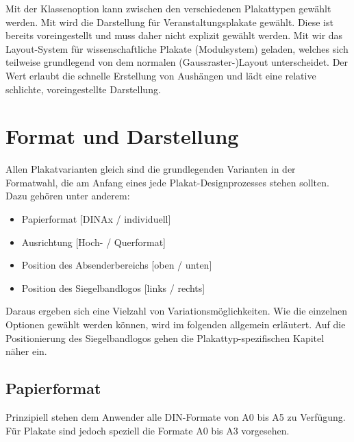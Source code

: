 Mit der Klassenoption  kann zwischen
den verschiedenen Plakattypen gewählt werden.
Mit  wird die Darstellung für Veranstaltungsplakate
gewählt. Diese ist bereits voreingestellt und muss daher nicht explizit gewählt
werden.
Mit  wir das Layout-System für wissenschaftliche Plakate
(Modulsystem) geladen, welches sich teilweise grundlegend von
dem normalen (Gaussraster-)Layout unterscheidet.
Der Wert  erlaubt die schnelle Erstellung von
Aushängen und lädt eine relative schlichte, voreingestellte Darstellung.


\section{Format und Darstellung}

Allen Plakatvarianten gleich sind die grundlegenden Varianten in der Formatwahl,
die am Anfang eines jede Plakat-Designprozesses stehen sollten.
Dazu gehören unter anderem:

\begin{itemize}
  \item Papierformat [DIN\;Ax / individuell]
  \item Ausrichtung [Hoch- / Querformat]
  \item Position des Absenderbereichs [oben / unten]
  \item Position des Siegelbandlogos [links / rechts]
\end{itemize}

Daraus ergeben sich eine Vielzahl von Variationsmöglichkeiten.
Wie die einzelnen Optionen gewählt werden können, wird im folgenden
allgemein erläutert.
Auf die Positionierung des Siegelbandlogos gehen die Plakattyp-spezifischen
Kapitel näher ein.%

\subsection*{Papierformat}%

Prinzipiell stehen dem Anwender alle DIN-Formate von A0 bis A5 zu Verfügung.
Für Plakate sind jedoch speziell die Formate A0 bis A3 vorgesehen.


\begin{Declaration}
  \\
  \\
  \\
  \\
\end{Declaration}

